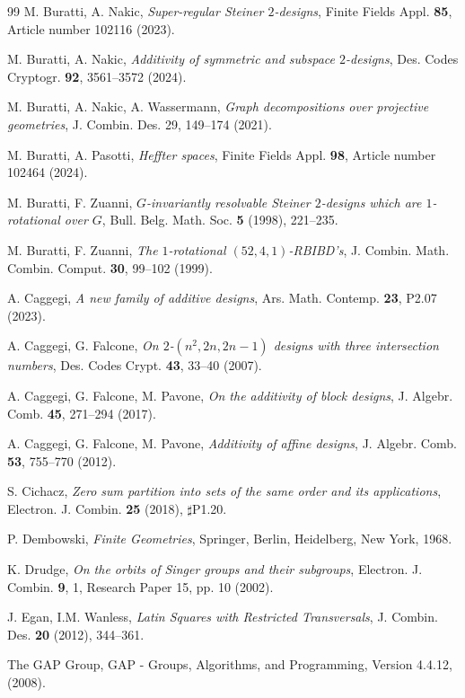 \documentclass[a4paper, 11pt]{article}
\theoremstyle{definition}
\theoremstyle{definition}
\theoremstyle{definition}
\numberwithin{equation}{section}
\begin{document}
\begin{thebibliography}{99}
 M. Buratti, A. Nakic,
{\it Super-regular Steiner $2$-designs}, Finite Fields Appl. {\bf85}, Article number 102116 (2023).

 M. Buratti, A. Nakic, 
{\it Additivity of symmetric and subspace $2$-designs}, Des. Codes Cryptogr. {\bf92}, 3561--3572 (2024).

M. Buratti, A. Nakic,  A. Wassermann,
{\it Graph decompositions over projective geometries},
J. Combin. Des. 29, 149--174 (2021).

 M. Buratti, A. Pasotti, {\it Heffter spaces}, Finite Fields Appl. {\bf98},  Article number 102464 (2024).

 M. Buratti, F. Zuanni,
{\it $G$-invariantly resolvable Steiner $2$-designs which are 
$1$-rotational over $G$},
Bull. Belg. Math. Soc. {\bf 5} (1998), 221--235. 

M. Buratti, F. Zuanni,
{\it The $1$-rotational $(52,4,1)$-RBIBD's},
J. Combin. Math. Combin. Comput. {\bf 30}, 99--102 (1999).

 A. Caggegi, {\it A new family of additive designs}, Ars. Math. Contemp. {\bf23}, P2.07 (2023).

 A. Caggegi, G. Falcone, {\it On $2$-$(n^2, 2n,2n-1)$ designs with three intersection numbers}, 
Des. Codes Crypt. {\bf43}, 33--40 (2007).

 A. Caggegi, G. Falcone, M. Pavone, {\it On the additivity of block designs}, 
J. Algebr. Comb. \textbf{45}, 271--294 (2017).

 A. Caggegi, G. Falcone, M. Pavone, {\it Additivity of affine designs}, 
J. Algebr. Comb. \textbf{53}, 755--770 (2012).

 S. Cichacz, {\it Zero sum partition into sets of the same order and its applications}, Electron. J. Combin. {\bf25} (2018), $\sharp$P1.20.

 P. Dembowski, {\it Finite Geometries}, Springer, Berlin, Heidelberg, New York, 1968.

 K. Drudge, {\it On the orbits of Singer groups and their subgroups}, Electron. J. Combin. {\bf9}, 1, Research Paper 15, pp. 10 (2002).

J. Egan, I.M. Wanless, {\it Latin Squares with Restricted Transversals},
J. Combin. Des. {\bf20} (2012), 344--361. 

The GAP Group, GAP - Groups, Algorithms, and Programming, Version 4.4.12, (2008).


\end{thebibliography}
\end{document}
